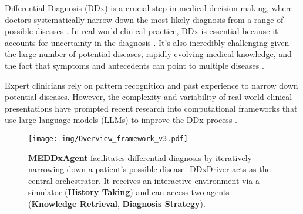 Differential Diagnosis (DDx) is a crucial step in medical decision-making, where doctors systematically narrow down the most likely diagnosis from a range of possible diseases \citep{rhoads2017formulating}. In real-world clinical practice, DDx is essential because it accounts for uncertainty in the diagnosis \citep{henderson2012patient}. It's also incredibly challenging given the large number of potential diseases, rapidly evolving medical knowledge, and the fact that symptoms and antecedents can point to multiple diseases \citep{winter2024ddxgym}.

Expert clinicians rely on pattern recognition and past experience to narrow down potential diseases. However, the complexity and variability of real-world clinical presentations have prompted recent research into computational frameworks that use large language models (LLMs) to improve the DDx process \citep{fansi2022towards,zhou2024interpretable}.

\begin{figure}[t]
	\centering
    \texttt{[image: img/Overview\_framework\_v3.pdf]}
    \caption{\textbf{MEDDxAgent} facilitates differential diagnosis by iteratively narrowing down a patient's possible disease. DDxDriver acts as the central orchestrator. It receives an interactive environment via a simulator (\textcolor{yellow-history}{\textbf{History Taking}}) and can access two agents (\textcolor{blue-retrieval}{\textbf{Knowledge Retrieval}}, \textcolor{green-diagnosis}{\textbf{Diagnosis Strategy}}).}
    \vspace{-1.8em}
    \label{fig:overview_ddxdriver}
\end{figure}

